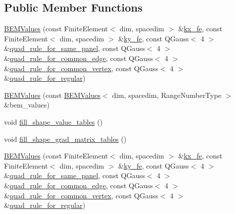 \subsection*{Public Member Functions}
\begin{DoxyCompactItemize}
\item 
\hyperlink{classLaplaceBEM_1_1BEMValues_a7095a2e5448fa5478cc2d9affe319abf}{B\+E\+M\+Values} (const Finite\+Element$<$ dim, spacedim $>$ \&\hyperlink{classLaplaceBEM_1_1BEMValues_a9107fb87f456e86caa04ba3348982189}{kx\+\_\+fe}, const Finite\+Element$<$ dim, spacedim $>$ \&\hyperlink{classLaplaceBEM_1_1BEMValues_a30eaa0b6f1e587c5b8d95a04d80fa9a8}{ky\+\_\+fe}, const Q\+Gauss$<$ 4 $>$ \&\hyperlink{classLaplaceBEM_1_1BEMValues_aabf571f3c530ff65274122e468c3c987}{quad\+\_\+rule\+\_\+for\+\_\+same\+\_\+panel}, const Q\+Gauss$<$ 4 $>$ \&\hyperlink{classLaplaceBEM_1_1BEMValues_ac1cdb156deba4802692ca916d40bacda}{quad\+\_\+rule\+\_\+for\+\_\+common\+\_\+edge}, const Q\+Gauss$<$ 4 $>$ \&\hyperlink{classLaplaceBEM_1_1BEMValues_a2b964d73a6d9bd80fe1ef419e1cebd4f}{quad\+\_\+rule\+\_\+for\+\_\+common\+\_\+vertex}, const Q\+Gauss$<$ 4 $>$ \&\hyperlink{classLaplaceBEM_1_1BEMValues_a65083f9822aa923512c775d0d9986939}{quad\+\_\+rule\+\_\+for\+\_\+regular})
\item 
\hyperlink{classLaplaceBEM_1_1BEMValues_ac40a849631e782f840a927e68bc2f9f6}{B\+E\+M\+Values} (const \hyperlink{classLaplaceBEM_1_1BEMValues}{B\+E\+M\+Values}$<$ dim, spacedim, Range\+Number\+Type $>$ \&bem\+\_\+values)
\item 
void \hyperlink{classLaplaceBEM_1_1BEMValues_a3fd86680a51e688d003d5a0bfe09629f}{fill\+\_\+shape\+\_\+value\+\_\+tables} ()
\item 
void \hyperlink{classLaplaceBEM_1_1BEMValues_a5383d5eb891f8cd742584e95aad976c8}{fill\+\_\+shape\+\_\+grad\+\_\+matrix\+\_\+tables} ()
\item 
\hyperlink{classLaplaceBEM_1_1BEMValues_a7095a2e5448fa5478cc2d9affe319abf}{B\+E\+M\+Values} (const Finite\+Element$<$ dim, spacedim $>$ \&\hyperlink{classLaplaceBEM_1_1BEMValues_a9107fb87f456e86caa04ba3348982189}{kx\+\_\+fe}, const Finite\+Element$<$ dim, spacedim $>$ \&\hyperlink{classLaplaceBEM_1_1BEMValues_a30eaa0b6f1e587c5b8d95a04d80fa9a8}{ky\+\_\+fe}, const Q\+Gauss$<$ 4 $>$ \&\hyperlink{classLaplaceBEM_1_1BEMValues_aabf571f3c530ff65274122e468c3c987}{quad\+\_\+rule\+\_\+for\+\_\+same\+\_\+panel}, const Q\+Gauss$<$ 4 $>$ \&\hyperlink{classLaplaceBEM_1_1BEMValues_ac1cdb156deba4802692ca916d40bacda}{quad\+\_\+rule\+\_\+for\+\_\+common\+\_\+edge}, const Q\+Gauss$<$ 4 $>$ \&\hyperlink{classLaplaceBEM_1_1BEMValues_a2b964d73a6d9bd80fe1ef419e1cebd4f}{quad\+\_\+rule\+\_\+for\+\_\+common\+\_\+vertex}, const Q\+Gauss$<$ 4 $>$ \&\hyperlink{classLaplaceBEM_1_1BEMValues_a65083f9822aa923512c775d0d9986939}{quad\+\_\+rule\+\_\+for\+\_\+regular})

\end{DoxyCompactItemize}
